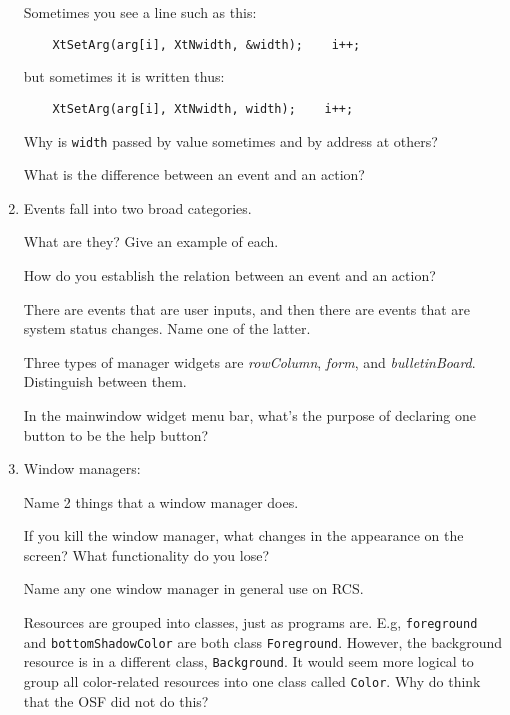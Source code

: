 \documentclass[twoside]{article}
\begin{document}
\begin{enumerate}
Sometimes you see a line such as this:
\begin{verbatim} 	XtSetArg(arg[i], XtNwidth, &width);    i++;
\end{verbatim}
but sometimes it is written thus:
\begin{verbatim}	XtSetArg(arg[i], XtNwidth, width);    i++;
\end{verbatim}
Why is {\tt width} passed by value sometimes and by address at others?

  What is the difference between an event and an action?


\item  Events fall into two broad categories.
\begin{enumerate}
 What are they?
 Give an example of each.
\end{enumerate}

 How do you establish the relation between an event and an
action?

 There are events that are user inputs, and then there are
events that are system status changes.  Name one of the latter.


 Three types of manager widgets are \emph{rowColumn},
\emph{form}, and \emph{bulletinBoard}.  Distinguish between them.


In the mainwindow widget menu bar, what's the purpose of declaring
one button to be the help button?


\item Window managers:
\begin{enumerate}
 Name 2 things that a window manager does.

 If you kill the window manager, what changes in the
appearance on the screen?  What functionality do you lose?

 Name any one window manager in general use on RCS.
\end{enumerate}


Resources are grouped into classes, just as programs are.  E.g,
\texttt{foreground} and \texttt{bottomShadowColor} are both class
\texttt{Foreground}. However, the background resource is in a
different class, \texttt{Background}.  It would seem more logical
to group all color-related resources into one class called
\texttt{Color}.  Why do think that the OSF did not do this?




\end{enumerate}
\end{document}
